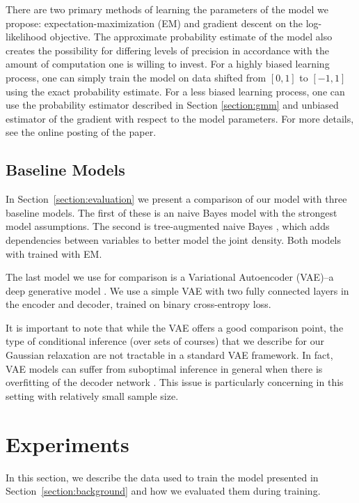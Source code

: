 \documentclass{edm_template}
\begin{document}
There are two primary methods of learning the parameters of the model we propose: expectation-maximization (EM) \cite{dempster1977maximum,baum1966statistical}  and gradient descent \cite{bottou2010large} on the log-likelihood objective. The approximate probability estimate of the model also creates the possibility for differing levels of precision in accordance with the amount of computation one is willing to invest. For a highly biased learning process, one can simply train the model on data shifted from $[0,1]$ to $[-1,1]$ using the exact probability estimate. For a less biased learning process, one can use the probability estimator described in Section \ref{section:gmm} and unbiased estimator of the gradient with respect to the model parameters. For more details, see the online posting of the paper.

\subsection{Baseline Models}
\label{section:baselines}

In Section~\ref{section:evaluation} we present a comparison of our model with three baseline models. The first of these is an naive Bayes model with the strongest model assumptions. The second is tree-augmented naive Bayes \cite{friedman1997bayesian}, which adds dependencies between variables to better model the joint density. Both models with trained with EM. 

The last model we use for comparison is a Variational Autoencoder (VAE)--a deep generative model \cite{kingma2013auto}. We use a simple VAE with two fully connected layers in the encoder and decoder, trained on binary cross-entropy loss.  

It is important to note that while the VAE offers a good comparison point, the type of conditional inference (over sets of courses) that we describe for our Gaussian relaxation are not tractable in a standard VAE framework. In fact, VAE models can suffer from suboptimal inference in general when there is overfitting of the decoder network \cite{cremer2018inference}. This issue is particularly concerning in this setting with relatively small sample size. 

\section{Experiments}

In this section, we describe the data used to train the model presented in Section~\ref{section:background} and how we evaluated them during training. 
\end{document}
